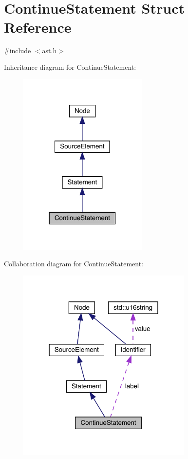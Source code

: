 \hypertarget{struct_continue_statement}{}\section{Continue\+Statement Struct Reference}
\label{struct_continue_statement}


{\ttfamily \#include $<$ast.\+h$>$}



Inheritance diagram for Continue\+Statement\+:\nopagebreak
\begin{figure}[H]
\begin{center}
\leavevmode
\includegraphics[width=182pt]{struct_continue_statement__inherit__graph}
\end{center}
\end{figure}


Collaboration diagram for Continue\+Statement\+:
\nopagebreak
\begin{figure}[H]
\begin{center}
\leavevmode
\includegraphics[width=247pt]{struct_continue_statement__coll__graph}
\end{center}
\end{figure}
